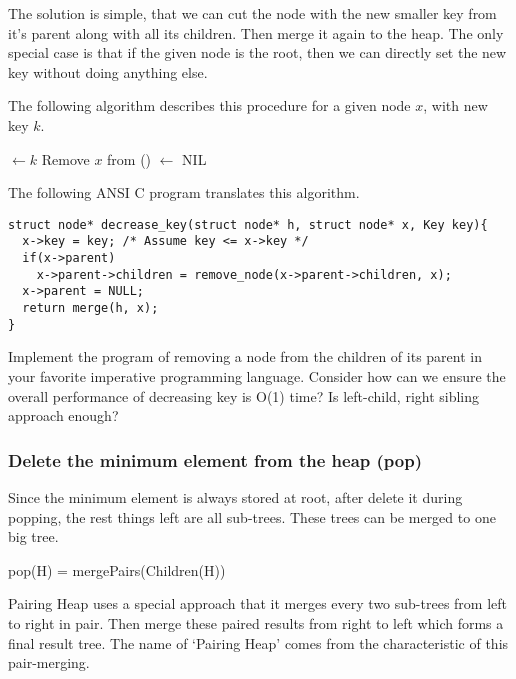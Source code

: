 \documentclass{article}
\begin{document}
The solution is simple, that we can cut the node with the new smaller
key from it's parent along with all its children. Then merge it again
to the heap. The only special case is that if the given node is the
root, then we can directly set the new key without doing anything else.

The following algorithm describes this procedure for a given node $x$, with
new key $k$.

\begin{algorithmic}[1]
  \State {} $\gets k$
    \State Remove $x$ from ()
  \EndIf
   $\gets$ NIL
  \State \Return {}
\EndFunction
\end{algorithmic}

The following ANSI C program translates this algorithm.

\lstset{language=C}
\begin{lstlisting}
struct node* decrease_key(struct node* h, struct node* x, Key key){
  x->key = key; /* Assume key <= x->key */
  if(x->parent)
    x->parent->children = remove_node(x->parent->children, x);
  x->parent = NULL;
  return merge(h, x);
}
\end{lstlisting}

\begin{Exercise}
Implement the program of removing a node from the children of its
parent in your favorite imperative programming language. Consider
how can we ensure the overall performance of decreasing key is
O(1) time? Is left-child, right sibling approach enough?
\end{Exercise}

\subsubsection{Delete the minimum element from the heap (pop)}
 
Since the minimum element is always stored at root, after delete it
during popping, the rest things left are all sub-trees. These trees
can be merged to one big tree.

\be
  pop(H) = mergePairs(Children(H))
\ee

Pairing Heap uses a special approach that it merges every two sub-trees
from left to right in pair. Then
merge these paired results from right to left which forms a final
result tree. The name of `Pairing Heap' comes from the characteristic
of this pair-merging.
\end{document}
